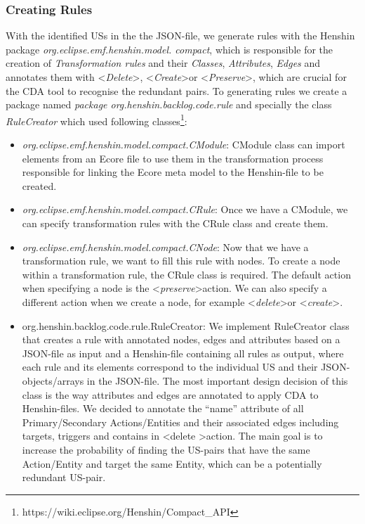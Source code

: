 \subsubsection*{Creating Rules}\label{workflow_rule_creator}
With the identified USs in the the JSON-file, we generate rules with the Henshin package \textit{org.eclipse.emf.henshin.model. compact}, which is responsible for the creation of \textit{Transformation rules} and their \textit{Classes}, \textit{Attributes}, \textit{Edges} and annotates them with \textless\emph{Delete}\textgreater, \textless\textit{Create}\textgreater or \textless\textit{Preserve}\textgreater, which are crucial for the CDA tool to recognise the redundant pairs. 
To generating rules we create a package named \textit{package org.henshin.backlog.code.rule} and specially the class \textit{RuleCreator} which used following classes\footnote{https://wiki.eclipse.org/Henshin/Compact\_API}\label{compact_api}:
\begin{itemize}
\item \textit{org.eclipse.emf.henshin.model.compact.CModule}: CModule class can import elements from an Ecore file to use them in the transformation process responsible for linking the Ecore meta model to the Henshin-file to be created.
\item \textit{org.eclipse.emf.henshin.model.compact.CRule}: Once we have a CModule, we can specify transformation rules with the CRule class and create them.
\item \textit{org.eclipse.emf.henshin.model.compact.CNode}: Now that we have a transformation rule, we want to fill this rule with nodes. To create a node within a transformation rule, the CRule class is required. The default action when specifying a node is the \textless\emph{preserve}\textgreater action. We can also specify a different action when we create a node, for example \textless\emph{delete}\textgreater or \textless\emph{create}\textgreater.
\item org.henshin.backlog.code.rule.RuleCreator: We implement RuleCreator class that creates a rule with annotated nodes, edges and attributes based on a JSON-file as input and a Henshin-file containing all rules as output, where each rule and its elements correspond to the individual US and their JSON-objects/arrays in the JSON-file. The most important design decision of this class is the way attributes and edges are annotated to apply CDA to Henshin-files. We decided to annotate the \enquote{name} attribute of all Primary/Secondary Actions/Entities and their associated edges including targets, triggers and contains in \textless delete \textgreater action. The main goal is to increase the probability of finding the US-pairs that have the same Action/Entity and target the same Entity, which can be a potentially redundant US-pair.
\end{itemize}

